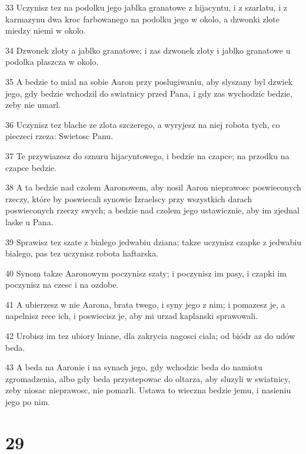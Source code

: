 \par 33 Uczynisz tez na podolku jego jablka granatowe z hijacyntu, i z szarlatu, i z karmazynu dwa kroc farbowanego na podolku jego w okolo, a dzwonki zlote miedzy niemi w okolo.
\par 34 Dzwonek zloty a jablko granatowe; i zas dzwonek zloty i jablko granatowe u podolka plaszcza w okolo.
\par 35 A bedzie to mial na sobie Aaron przy poslugiwaniu, aby slyszany byl dzwiek jego, gdy bedzie wchodzil do swiatnicy przed Pana, i gdy zas wychodzic bedzie, zeby nie umarl.
\par 36 Uczynisz tez blache ze zlota szczerego, a wyryjesz na niej robota tych, co pieczeci rzeza: Swietosc Panu.
\par 37 Te przywiazesz do sznuru hijacyntowego, i bedzie na czapce; na przodku na czapce bedzie.
\par 38 A ta bedzie nad czolem Aaronowem, aby nosil Aaron nieprawosc poswieconych rzeczy, które by poswiecali synowie Izraelscy przy wszystkich darach poswieconych rzeczy swych; a bedzie nad czolem jego ustawicznie, aby im zjednal laske u Pana.
\par 39 Sprawisz tez szate z bialego jedwabiu dziana; takze uczynisz czapke z jedwabiu bialego, pas tez uczynisz robota haftarska.
\par 40 Synom takze Aaronowym poczynisz szaty; i poczynisz im pasy, i czapki im poczynisz na czesc i na ozdobe.
\par 41 A ubierzesz w nie Aarona, brata twego, i syny jego z nim; i pomazesz je, a napelnisz rece ich, i poswiecisz je, aby mi urzad kaplanski sprawowali.
\par 42 Urobisz im tez ubiory lniane, dla zakrycia nagosci ciala; od biódr az do udów beda.
\par 43 A beda na Aaronie i na synach jego, gdy wchodzic beda do namiotu zgromadzenia, albo gdy beda przystepowac do oltarza, aby sluzyli w swiatnicy, zeby niosac nieprawosc, nie pomarli. Ustawa to wieczna bedzie jemu, i nasieniu jego po nim.

\chapter{29}

